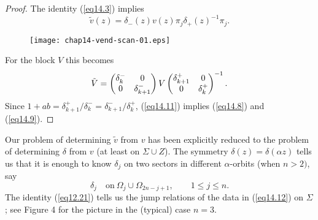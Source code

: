\documentclass{surv-l}
\theoremstyle{plain}
\theoremstyle{definition}
\numberwithin{equation}{chapter}
\begin{document}
\begin{proof}
The identity (\ref{eq14.3}) implies
\begin{equation}\label{eq14.10}
\tilde{v}(z)=\delta_{-}(z)v(z)\pi_{j}\delta_{+}(z)^{-1}\pi_{j}.
\end{equation}
\begin{figure}
\texttt{[image: chap14-vend-scan-01.eps]}
\caption{}\label{fig4}
\end{figure}
For the block $V$ this becomes
\begin{align}\label{eq14.11}
\tilde{V}=\left(\begin{array}{@{}cc@{}}
\delta_{k}^{-} & 0\\
0 & \delta_{k+1}^{-}
\end{array}\right) V \left(\begin{array}{@{}cc@{}}
\delta_{k+1}^{+} & 0\\
0 & \delta_{k}^{+}
\end{array}\right)^{-1}.
\end{align}
Since $1+ab=\delta_{k+1}^{+}/\delta_{k}^{-}=\delta_{k+1}^{-}/\delta_{k}^{+}$, (\ref{eq14.11}) implies (\ref{eq14.8}) and (\ref{eq14.9}).\quad
\end{proof}
Our problem of determining $\tilde{v}$ from $v$ has been explicitly reduced to the problem of determining $\delta$ from $v$ (at least on $\Sigma\cup Z$). The symmetry $\delta(z)=\delta(\alpha z)$ tells us that it is enough to know $\delta_{j}$ on two sectors in different $\alpha$-orbits (when $n>2)$, say
\begin{equation}\label{eq14.12}
\delta_{j}\quad \mathrm{on}\ \Omega_{j}\cup\Omega_{2n-j+1},\qquad 1\leq j\leq n.
\end{equation}
The identity (\ref{eq12.21}) tells us the jump relations of the data in (\ref{eq14.12}) on $\Sigma$; see Figure 4 for the picture in the (typical) case $n=3$.
\setcounter{theorem}{12}
\end{document}
